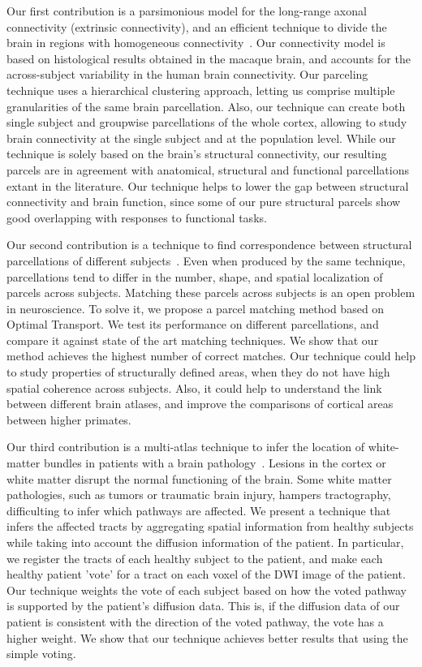 Our first contribution is a parsimonious model for the long-range axonal
connectivity (extrinsic connectivity), and an efficient technique to divide the
brain in regions with homogeneous connectivity~\cite{Gallardo2017a}. Our
connectivity model is based on histological results obtained in the macaque
brain, and accounts for the across-subject variability in the human brain
connectivity. Our parceling technique uses a hierarchical clustering approach,
letting us comprise multiple granularities of the same brain parcellation.
Also, our technique can create both single subject and groupwise parcellations
of the whole cortex, allowing to study brain connectivity at the single subject
and at the population level. While our technique is solely based on the brain's
structural connectivity, our resulting parcels are in agreement with anatomical,
structural and functional parcellations extant in the literature. Our technique
helps to lower the gap between structural connectivity and brain function, since
some of our pure structural parcels show good overlapping with responses to
functional tasks.

Our second contribution is a technique to find correspondence between
structural parcellations of different subjects~\cite{Gallardo2018}. Even when
produced by the same technique, parcellations tend to differ in the
number, shape, and spatial localization of parcels across subjects. Matching
these parcels across subjects is an open problem in neuroscience. To solve
it, we propose a parcel matching method based on Optimal Transport. We test its
performance on different parcellations, and compare it against state of the
art matching techniques. We show that our method achieves the highest number
of correct matches. Our technique could help to study properties of structurally
defined areas, when they do not have high spatial coherence across subjects.
Also, it could help to understand the link between different brain atlases, and
improve the comparisons of cortical areas between higher primates.

Our third contribution is a multi-atlas technique to infer the location of 
white-matter bundles in patients with a brain pathology~\cite{Guillermo2018}.
Lesions in the cortex or white matter disrupt the normal functioning of the
brain. Some white matter pathologies, such as tumors or traumatic brain injury,
hampers tractography, difficulting to infer which pathways are affected. We 
present a technique that infers the affected tracts by aggregating spatial
information from healthy subjects while taking into account the diffusion
information of the patient. In particular, we register the tracts of each
healthy subject to the patient, and make each healthy patient 'vote' for a
tract on each voxel of the DWI image of the patient. Our technique weights the
vote of each subject based on how the voted pathway is supported by the patient's 
diffusion data. This is, if the diffusion data of our patient is consistent with
the direction of the voted pathway, the vote has a higher weight. We show that
our technique achieves better results that using the simple voting.

